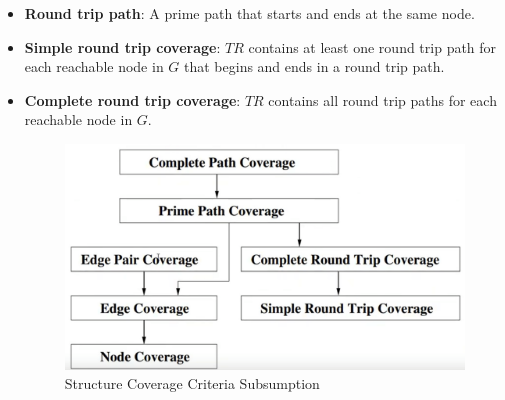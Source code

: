 \documentclass[a4paper]{article}
\begin{document}
\begin{itemize}
    \item \textbf{Round trip path}: A prime path that starts and ends at the same node.
    \item \textbf{Simple round trip coverage}: $TR$ contains at least one round trip path for each reachable node in $G$ that begins and ends in a round trip path.
    \item \textbf{Complete round trip coverage}: $TR$ contains all round trip paths for each reachable node in $G$.
    \begin{figure}[H]
        \centering
        \includegraphics[width=0.5\linewidth]{Degree//static/ST_Structural_Coverage.png}
        \caption{Structure Coverage Criteria Subsumption}
        \label{fig:ST-structure-coverage}
    \end{figure}
\end{itemize}
\end{document}
